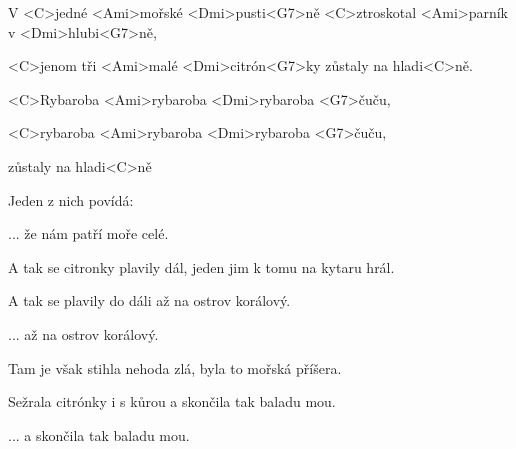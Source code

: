 

\zs
V <C>jedné <Ami>mořské <Dmi>pusti<G7>ně
<C>ztroskotal <Ami>parník v <Dmi>hlubi<G7>ně,

<C>jenom tři <Ami>malé <Dmi>citrón<G7>ky
zůstaly na hladi<C>ně.
\ks

\zr
<C>Rybaroba <Ami>rybaroba <Dmi>rybaroba <G7>čuču,

<C>rybaroba <Ami>rybaroba <Dmi>rybaroba <G7>čuču,

zůstaly na hladi<C>ně
\kr

\zs
Jeden z nich povídá: 
\ks

\zr ... že nám patří moře celé. \kr

\zs
A tak se citronky plavily dál, jeden jim k tomu na kytaru hrál.

A tak se plavily do dáli až na ostrov korálový.
\ks

\zr ... až na ostrov korálový. \kr

\zs
Tam je však stihla nehoda zlá, byla to mořská příšera.

Sežrala citrónky i s kůrou a skončila tak baladu mou.
\ks

\zr ... a skončila tak baladu mou. \kr

\kp























